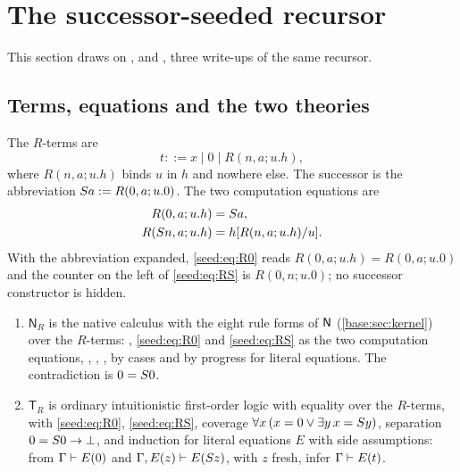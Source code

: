 \section{The successor-seeded recursor}
\label{seed:sec:succ}

This section draws on ,  and
, three write-ups of the same recursor.

\subsection{Terms, equations and the two theories}

\begin{definition}\label{seed:def:succ}
The $R$-terms are
\[
 t \mathrel{::=} x \mid 0 \mid R(n,a;u.h),
\]
where $R(n,a;u.h)$ binds $u$ in $h$ and nowhere else. The successor is the
abbreviation $S a\mathrel{:=} R(0,a;u.0)$. The two computation equations are
\begin{align}
 R(0,a;u.h)&=S a, \label{seed:eq:R0}\\
 R(S n,a;u.h)&=h[R(n,a;u.h)/u]. \label{seed:eq:RS}
\end{align}
With the abbreviation expanded, \eqref{seed:eq:R0} reads
$R(0,a;u.h)=R(0,a;u.0)$ and the counter on the left of \eqref{seed:eq:RS} is
$R(0,n;u.0)$; no successor constructor is hidden.
\begin{enumerate}[label=(\alph*),nosep]
\item $\mathsf{N}_R$ is the native calculus with the eight rule forms of
$\mathsf{N}$ (\cref{base:sec:kernel}) over the $R$-terms: ,
\eqref{seed:eq:R0} and \eqref{seed:eq:RS} as the two computation equations,
, , ,  by cases and
 by progress for literal equations. The contradiction is
$0=S 0$.
\item $\mathsf{T}_R$ is ordinary intuitionistic first-order logic with equality
over the $R$-terms, with \eqref{seed:eq:R0}, \eqref{seed:eq:RS}, coverage
$\forall x\,(x=0\lor\exists y\,x=S y)$, separation $0=S 0\to\bot$, and
induction for literal equations $E$ with side assumptions:
from $\Gamma\vdash E(0)$ and $\Gamma,E(z)\vdash E(S z)$, with $z$ fresh,
infer $\Gamma\vdash E(t)$.
\end{enumerate}
\end{definition}


